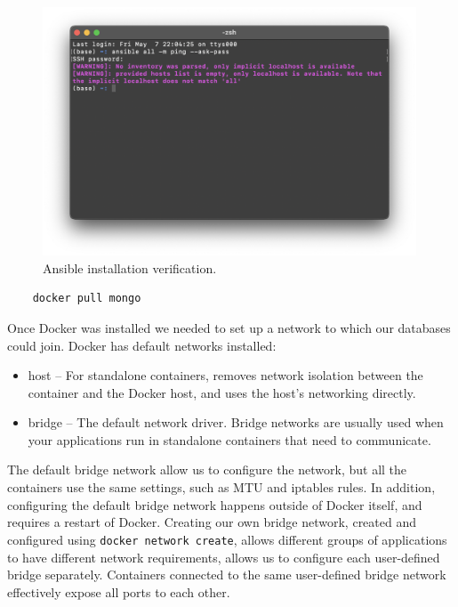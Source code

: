 \documentclass{article}
\begin{document}
\begin{figure}[ht]
    \centering
    \includegraphics[width=0.99\textwidth]{Ansible-verify.png}
    \vspace{-2em}\caption{Ansible installation verification.}
    \label{fig:Ansible-verify}
\end{figure}


\begin{tcolorbox}[colback=CrispBlue!5!white,colframe=CrispBlue!75!black,title=Pulls latest version of MongoDB from Docker Hub]
    \begin{verbatim}    
    docker pull mongo
\end{verbatim}
\end{tcolorbox}


\newpage
Once Docker was installed we needed to set up a network to which our databases could join. Docker has default networks installed:
\begin{itemize}
    \item host -- For standalone containers, removes network isolation between the container and the Docker host, and uses the host’s networking directly.
    \item bridge -- The default network driver. Bridge networks are usually used when your applications run in standalone containers that need to communicate.
\end{itemize}

The default bridge network allow us to configure the network, but all the containers use the same settings, such as MTU and iptables rules. In addition, configuring the default bridge network happens outside of Docker itself, and requires a restart of Docker. Creating our own bridge network, created and configured using \texttt{docker network create}, allows different groups of applications to have different network requirements, allows us to configure each user-defined bridge separately. Containers connected to the same user-defined bridge network effectively expose all ports to each other.
\end{document}
